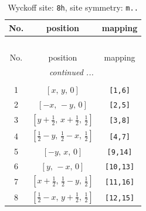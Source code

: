 \documentclass[fleqn,8pt]{jsarticle}
\begin{document}
\begin{longtable}{ccc}
\caption{Wyckoff site: {\tt 8h}, site symmetry: {\tt m..}}
 \\
 \hline \hline
No. & position & mapping \\ \hline \endfirsthead

\multicolumn{2}{l}{\tablename\ \thetable{}} \\
 \hline \hline
No. & position & mapping \\ \hline \endhead

 \hline \hline
\multicolumn{2}{r}{\footnotesize\it continued ...} \\ \endfoot

 \hline \hline
\multicolumn{2}{r}{} \\ \endlastfoot

1 & $\left[ x,\, y,\, 0 \right]$ & {\tt [1,6]} \\ \hline
2 & $\left[ - x,\, - y,\, 0 \right]$ & {\tt [2,5]} \\ \hline
3 & $\left[ y + \frac{1}{2},\, x + \frac{1}{2},\, \frac{1}{2} \right]$ & {\tt [3,8]} \\ \hline
4 & $\left[ \frac{1}{2} - y,\, \frac{1}{2} - x,\, \frac{1}{2} \right]$ & {\tt [4,7]} \\ \hline
5 & $\left[ - y,\, x,\, 0 \right]$ & {\tt [9,14]} \\ \hline
6 & $\left[ y,\, - x,\, 0 \right]$ & {\tt [10,13]} \\ \hline
7 & $\left[ x + \frac{1}{2},\, \frac{1}{2} - y,\, \frac{1}{2} \right]$ & {\tt [11,16]} \\ \hline
8 & $\left[ \frac{1}{2} - x,\, y + \frac{1}{2},\, \frac{1}{2} \right]$ & {\tt [12,15]} \\
\end{longtable}
\renewcommand{\arraystretch}{1.2}
\end{document}
